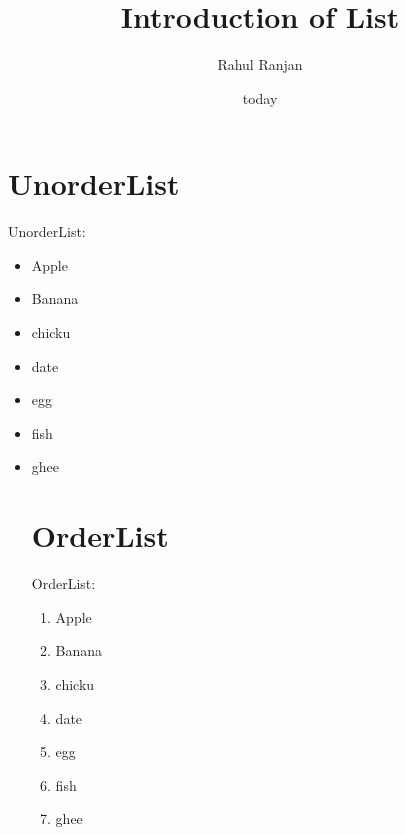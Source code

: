 \documentclass{article}
\title{Introduction of List}
\author{Rahul Ranjan}
\date{today}
\begin{document}
    \maketitle
    \newpage
    \tableofcontents
\newpage
    \section{UnorderList}
    UnorderList:
    \begin{itemize}
        \item Apple
        \item Banana
        \item chicku
        \item date
        \item egg
        \item fish
        \item ghee
\newpage
\section{OrderList}
    OrderList:
    \begin{enumerate}
        \item Apple
        \item Banana
        \item chicku
        \item date
        \item egg
        \item fish
        \item ghee
    \end{enumerate}
    \end{itemize}
\end{document}
